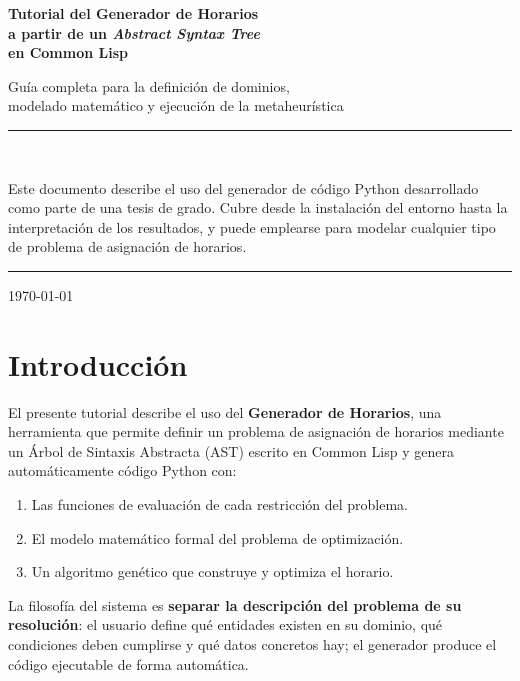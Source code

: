 \documentclass[12pt,a4paper]{article}
\begin{document}
\begin{titlepage}
  \centering
  \vspace*{3cm}
  {\LARGE\bfseries Tutorial del Generador de Horarios\\[0.5em]
   a partir de un \textit{Abstract Syntax Tree}\\
   en Common Lisp\par}
  \vspace{1.5cm}
  {\large Guía completa para la definición de dominios,\\
   modelado matemático y ejecución de la metaheurística\par}
  \vspace{2cm}
  \rule{\linewidth}{0.5pt}\\[0.5em]
  {\normalsize
    Este documento describe el uso del generador de código Python
    desarrollado como parte de una tesis de grado.
    Cubre desde la instalación del entorno hasta la interpretación
    de los resultados, y puede emplearse para modelar cualquier tipo
    de problema de asignación de horarios.\par}
  \rule{\linewidth}{0.5pt}
  \vfill
  {\small \today}
\end{titlepage}

\tableofcontents
\newpage

\section{Introducción}

El presente tutorial describe el uso del \textbf{Generador de Horarios},
una herramienta que permite definir un problema de asignación de horarios
mediante un Árbol de Sintaxis Abstracta (AST) escrito en Common Lisp y
genera automáticamente código Python con:

\begin{enumerate}
  \item Las funciones de evaluación de cada restricción del problema.
  \item El modelo matemático formal del problema de optimización.
  \item Un algoritmo genético que construye y optimiza el horario.
\end{enumerate}

La filosofía del sistema es \textbf{separar la descripción del problema
de su resolución}: el usuario define qué entidades existen en su dominio,
qué condiciones deben cumplirse y qué datos concretos hay; el generador
produce el código ejecutable de forma automática.
\end{document}
